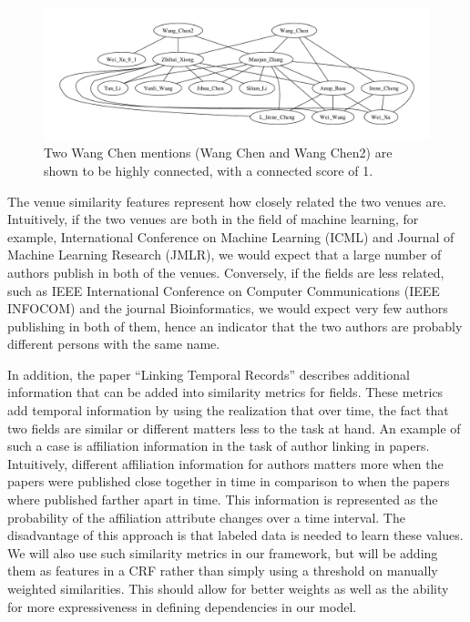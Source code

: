 \documentclass[twocolumn,letterpaper]{article}
\begin{document}
\begin{figure}
\centering
\includegraphics[width=\textwidth]{g5}
\caption{Two Wang Chen mentions (Wang Chen and Wang Chen2) are shown to be highly connected, with a connected score of 1.}
\label{fig:chen}
\end{figure}

The venue similarity features represent how closely related the two venues are.  Intuitively, if the two venues are both in the field of machine learning, for example, International Conference on Machine Learning (ICML) and Journal of Machine Learning Research (JMLR), we would expect that a large number of authors publish in both of the venues.  Conversely, if the fields are less related, such as IEEE International Conference on Computer Communications (IEEE INFOCOM) and the journal Bioinformatics, we would expect very few authors publishing in both of them, hence an indicator that the two authors are probably different persons with the same name.

In addition, the paper ``Linking Temporal Records'' \cite{DBLP:journals/fcsc/LiDMS12} describes additional information that can be added into similarity metrics for fields. These metrics add temporal information by using the realization that over time, the fact that two fields are similar or different matters less to the task at hand. An example of such a case is affiliation information in the task of author linking in papers. Intuitively, different affiliation information for authors matters more when the papers were published close together in time in comparison to when the papers where published farther apart in time. This information is represented as the probability of the affiliation attribute changes over a time interval. The disadvantage of this approach is that labeled data is needed to learn these values.  We will also use such similarity metrics in our framework, but will be adding them as features in a CRF rather than simply using a threshold on manually weighted similarities. This should allow for better weights as well as the ability for more expressiveness in defining dependencies in our model.
\end{document}
